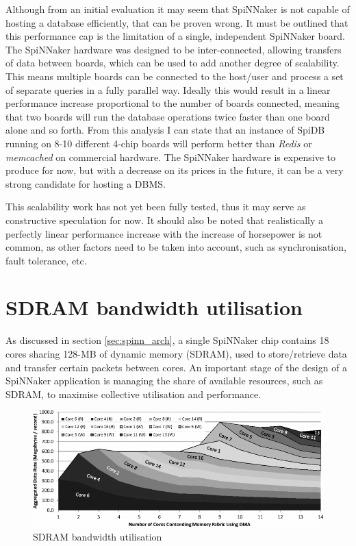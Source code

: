 Although from an initial evaluation it may seem that SpiNNaker is not capable of hosting a database efficiently, that can be proven wrong. It must be outlined that this performance cap is the limitation of a single, independent SpiNNaker board. The SpiNNaker hardware was designed to be inter-connected, allowing transfers of data between boards, which can be used to add another degree of scalability. This means multiple boards can be connected to the host/user and process a set of separate queries in a fully parallel way. Ideally this would result in a linear performance increase proportional to the number of boards connected, meaning that two boards will run the database operations twice faster than one board alone and so forth. From this analysis I can state that an instance of SpiDB running on 8-10 different 4-chip boards will perform better than \textit{Redis} or \textit{memcached} on commercial hardware. The SpiNNaker hardware is expensive to produce for now, but with a decrease on its prices in the future, it can be a very strong candidate for hosting a DBMS.

This scalability work has not yet been fully tested, thus it may serve as constructive speculation for now. It should also be noted that realistically a perfectly linear performance increase with the increase of horsepower is not common, as other factors need to be taken into account, such as synchronisation, fault tolerance, etc.


\section{SDRAM bandwidth utilisation}
\label{sec:limitations}
As discussed in section \ref{sec:spinn_arch}, a single SpiNNaker chip contains 18 cores sharing 128-MB of dynamic memory (SDRAM), used to store/retrieve data and transfer certain packets between cores. An important stage of the design of a SpiNNaker application is managing the share of available resources, such as SDRAM, to maximise collective utilisation and performance.

\begin{figure}
\begin{center}
	\includegraphics[width=1.3\textwidth, natwidth=820, natheight=329]{images/sdram_bandwidth.png}
\end{center}
\caption{SDRAM bandwidth utilisation \cite{painkras}}
\label{fig:sdram_bandwidth}
\end{figure}

